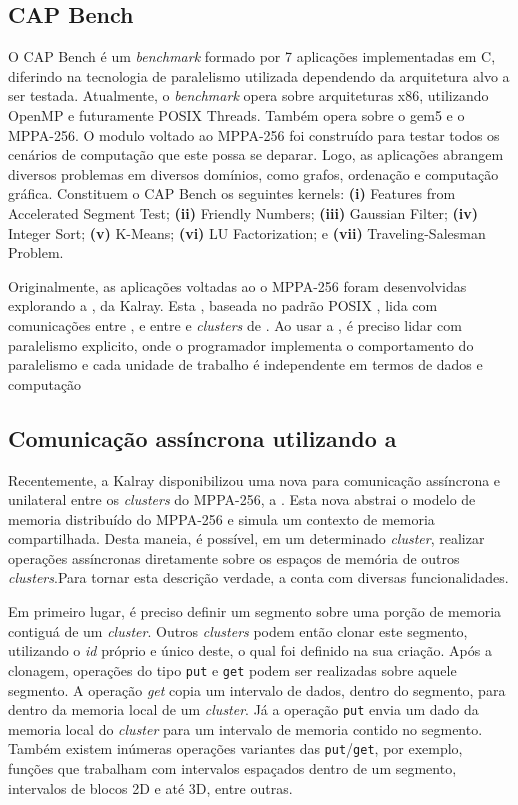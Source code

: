 \documentclass[a4paper,11pt]{article}
\newcommand{\mppa}{MPPA-256\xspace}
\newcommand{\capb}{CAP Bench\xspace}
\begin{document}
\subsection{\capb}
\label{subsec:capb}

O \capb é um \textit{benchmark} formado por 7 aplicações implementadas em C, diferindo na tecnologia de paralelismo utilizada dependendo da arquitetura alvo a ser testada. Atualmente, o \textit{benchmark} opera sobre arquiteturas x86, utilizando OpenMP e futuramente POSIX Threads. Também opera sobre o gem5 e o \mppa. O modulo voltado ao \mppa foi construído para testar todos os cenários de computação que este possa se deparar. Logo, as aplicações abrangem diversos problemas em diversos domínios, como grafos, ordenação e computação gráfica. Constituem o \capb os seguintes kernels: \textbf{(i)} Features from Accelerated Segment Test; \textbf{(ii)} Friendly Numbers; \textbf{(iii)} Gaussian Filter; \textbf{(iv)} Integer Sort; \textbf{(v)} K-Means; \textbf{(vi)} LU Factorization; e \textbf{(vii)} Traveling-Salesman Problem.

Originalmente, as aplicações voltadas ao o \mppa foram desenvolvidas explorando a \api \ipc, da Kalray. Esta \api, baseada no padrão POSIX \ipc, lida com comunicações entre \ccs, e entre \ccs e \textit{clusters} de \es. Ao usar a \ipc, é preciso lidar com paralelismo explicito, onde o programador implementa o comportamento do paralelismo e cada unidade de trabalho é independente em termos de dados e computação \cite{Castro-Souza-CCPE:2016}


\subsection{Comunicação assíncrona utilizando a \api \async}
\label{subsec:async}

Recentemente, a Kalray disponibilizou uma nova \api para comunicação assíncrona e unilateral entre os \textit{clusters} do \mppa, a \async. Esta nova \api abstrai o modelo de memoria distribuído do \mppa e simula um contexto de memoria compartilhada. Desta maneia, é possível, em um determinado \textit{cluster}, realizar operações assíncronas diretamente sobre os espaços de memória de outros \textit{clusters}.Para tornar esta descrição verdade, a \api conta com diversas funcionalidades.

Em primeiro lugar, é preciso definir um segmento sobre uma porção de memoria contiguá de um \textit{cluster}. Outros \textit{clusters} podem então clonar este segmento, utilizando o \textit{id} próprio e único deste, o qual foi definido na sua criação. Após a clonagem, operações do tipo \texttt{put} e \texttt{get} podem ser realizadas sobre aquele segmento. A operação \textit{get} copia um intervalo de dados, dentro do segmento, para dentro da memoria local de um \textit{cluster}. Já a operação \texttt{put} envia um dado da memoria local do \textit{cluster} para um intervalo de memoria contido no segmento. Também existem inúmeras operações variantes das \texttt{put}/\texttt{get}, por exemplo, funções que trabalham com intervalos espaçados dentro de um segmento, intervalos de blocos 2D e até 3D, entre outras.
\end{document}
